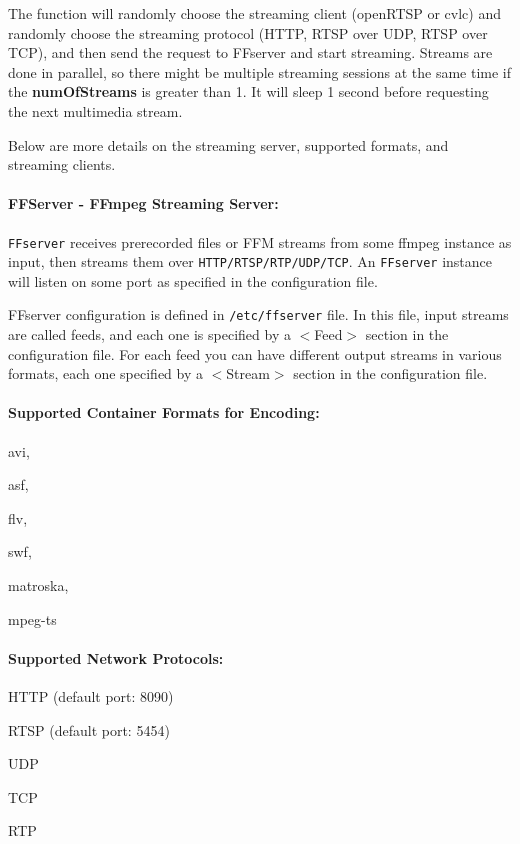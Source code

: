 \documentclass[a4paper]{article}
\begin{document}
The function will randomly choose the streaming client (openRTSP or cvlc) and randomly choose the streaming protocol (HTTP, RTSP over UDP, RTSP over TCP), and then send the request to FFserver and start streaming. 
Streams are done in parallel, so there might be multiple streaming sessions at the same time if the \textbf{numOfStreams} is greater than 1.
It will sleep 1 second before requesting the next multimedia stream.

Below are more details on the streaming server, supported formats, and streaming clients.

\paragraph{FFServer - FFmpeg Streaming Server:}
\texttt{FFserver} receives prerecorded files or FFM streams from some ffmpeg instance as input, then streams them over \texttt{HTTP/RTSP/RTP/UDP/TCP}. 
An \texttt{FFserver} instance will listen on some port as specified in the configuration file. 


FFserver configuration is defined in \texttt{/etc/ffserver} file. 
In this file, input streams are called feeds, and each one is specified by a $<$Feed$>$ section in the configuration file.
For each feed you can have different output streams in various formats, each one specified by a $<$Stream$>$ section in the configuration file.

\paragraph{Supported Container Formats for Encoding:}
\begin{enumerate*}[label=(\roman*)]
	\item avi, 
	\item asf, 
	\item flv,
	\item swf, 
	\item matroska, 
	\item mpeg-ts
\end{enumerate*}

\paragraph{Supported Network Protocols:}
\begin{enumerate*}[label=(\roman*)]
	\item HTTP (default port: 8090)
	\item RTSP (default port: 5454)
	\item UDP
	\item TCP
	\item RTP
\end{enumerate*}
\end{document}
